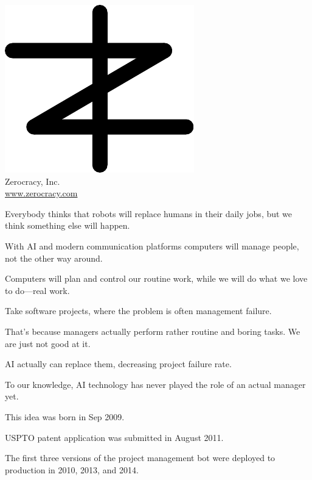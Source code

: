 \documentclass{article}
\begin{document}

\pagecolor{white}
\newcommand\slide[1]{%
  \pagebreak\topskip0pt\vspace*{\fill}%
  \begin{center}\Huge%
  #1
  \end{center}%
  \vspace*{\fill}%
}

\slide{\includegraphics[scale=1]{../images/zerocracy-logo.pdf}\\
Zerocracy, Inc.\\[1em]
\large \href{https://www.zerocracy.com}{www.zerocracy.com}}

\slide{Everybody thinks that robots will replace humans in their daily jobs, but we think something else will happen.}

\slide{With AI and modern communication platforms computers will manage people, not the other way around.}

\slide{Computers will plan and control our routine work, while we will do what we love to do---real work.}

\slide{Take software projects, where the problem is often management failure.}

\slide{That's because managers actually perform rather routine and boring tasks. We are just not good at it.}

\slide{AI actually can replace them, decreasing project failure rate.}

\slide{To our knowledge, AI technology has never played the role of an actual manager yet.}

\slide{This idea was born in Sep 2009.}

\slide{USPTO patent application was submitted in August 2011.\quad{\large US 12/703,202}}

\slide{The first three versions of the project management bot were deployed to production in 2010, 2013, and 2014.}
\end{document}

